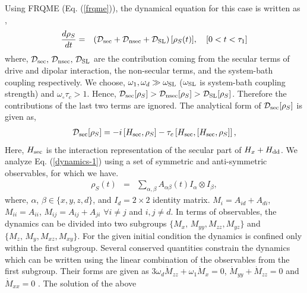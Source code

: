 \documentclass[prl,aps,twocolumn,floatfix]{revtex4-1}
\newcommand{\rh}{\rho_{\scriptstyle  S}}
\begin{document}
Using FRQME (Eq. (\ref{frqme})), the dynamical equation for this case is written as \cite{saha_cascaded_2023},
\begin{eqnarray}\label{dynamics-1}
\frac{d\rh}{dt}&=& \left( \mathcal{D}_{\scriptstyle \rm sec} + \mathcal{D}_{\scriptstyle \rm nsec} 
+ \mathcal{D}_{\scriptstyle \rm SL}\right) [\rh(t)],\quad [0<t<\tau_1]
\end{eqnarray}
where,
$\mathcal{D}_{\scriptstyle \rm sec},\,\mathcal{D}_{\scriptstyle \rm nsec}, \, \mathcal{D}_{\scriptstyle \rm SL} $ are the contribution coming from the secular terms of drive and dipolar interaction, the non-secular terms, and the system-bath coupling respectively.
We choose, $\omega_1, \omega_d \gg \omega_{\rm SL}$ ($\omega_{\rm SL}$ is system-bath coupling strength) and $\omega_\circ \tau_c >1$. Hence, $\mathcal{D}_{\scriptstyle \rm sec}[\rh]>\mathcal{D}_{\scriptstyle \rm nsec}[\rh] > \mathcal{D}_{\scriptstyle \rm SL}[\rh]$. Therefore the contributions of the last two terms are ignored. The analytical form of $\mathcal{D}_{\scriptstyle \rm sec}[\rh]$ is given as,
\begin{eqnarray}
\mathcal{D}_{\scriptstyle \rm sec}[\rh] = -i\left[H_{\scriptstyle \rm sec}, \rh\right] -  \tau_c\left[
H_{\scriptstyle \rm sec},\left[H_{\scriptstyle \rm sec},\rh \right] \right],
\end{eqnarray}
 Here, $H_{\scriptstyle \rm sec}$ is the interaction representation of the secular part of $H_x + H_{\scriptstyle \rm dd} $. We analyze Eq. (\ref{dynamics-1}) using a set of symmetric and anti-symmetric observables, for which we have.
\begin{eqnarray}\label{obs}
\rh (t) &=& \sum\limits_{\alpha, \beta }  A_{\alpha \beta} (t)I_{\alpha} \otimes I_{\beta},
\end{eqnarray}
where, $\alpha$, $\beta \in \{x,y,z,d\}$, and $I_d = 2\times 2$ identity matrix.  $M_i = A_{id}  + A_{di}$, $M_{ii} = A_{ii}$, $M_{ij} = A_{ij} + A_{ji}$ $\forall i\neq j$ and $i,j \neq d$. In terms of observables, the dynamics can be divided into two subgroups $\{M_x,\, M_{yy}, M_{zz}, M_{yz}\}$ and  $\{M_z,\, M_{y}, M_{xz}, M_{xy}\}$. For the given initial condition the dynamics is confined only within the first subgroup. Several conserved quantities constrain the dynamics which can be written using the linear combination of the observables from the first subgroup. Their forms are given as $3\omega_{d}\dot{M}_{zz}+\omega_1  \dot{M}_{x} = 0$,  
$\dot{M}_{yy}+\dot{M}_{zz} =0$ and $\dot{M}_{xx} = 0$ \cite{saha_cascaded_2023}. The solution of the above
\end{document}
